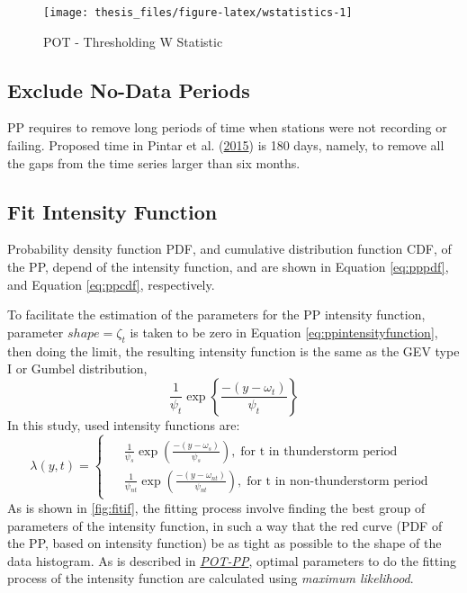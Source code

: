 \documentclass[12pt,oneside]{reedthesis}
\begin{document}
\footnotesize
\begin{figure}

{\centering \texttt{[image: thesis\_files/figure-latex/wstatistics-1]} 

}

\caption{POT - Thresholding W Statistic}\label{fig:wstatistics}
\end{figure}
\normalsize

\hypertarget{exclude-no-data-periods}{%
\subsection{Exclude No-Data Periods}\label{exclude-no-data-periods}}

PP requires to remove long periods of time when stations were not recording or failing. Proposed time in Pintar et al. (\protect\hyperlink{ref-Pintar2015}{2015}) is 180 days, namely, to remove all the gaps from the time series larger than six months.

\hypertarget{fit-intensity-function}{%
\subsection{Fit Intensity Function}\label{fit-intensity-function}}

Probability density function PDF, and cumulative distribution function CDF, of the PP, depend of the intensity function, and are shown in Equation \eqref{eq:pppdf}, and Equation \eqref{eq:ppcdf}, respectively.

To facilitate the estimation of the parameters for the PP intensity function, parameter \(shape = \zeta_t\) is taken to be zero in Equation \eqref{eq:ppintensityfunction}, then doing the limit, the resulting intensity function is the same as the GEV type I or Gumbel distribution,
\begin{equation}
          \frac{1}{\psi_t}\exp\left\{\frac{-(y-\omega_t)}{\psi_t}\right\}
  \label{eq:ppusedif}
\end{equation}
In this study, used intensity functions are:
\begin{equation}
    \lambda\left(y,t\right)=
    \begin{cases}
      \begin{aligned}
            &\frac{1}{\psi_s}\exp\left(\frac{-(y-\omega_s)}{\psi_s}\right),\;\textrm{for t in thunderstorm period}
            \\
            &\frac{1}{\psi_{nt}}\exp\left(\frac{-(y-\omega_{nt})}{\psi_{nt}}\right),\;\textrm{for t in non-thunderstorm period}    
      \end{aligned}
    \end{cases}
  \label{eq:ppspecificintensityfunction}
\end{equation}
As is shown in \ref{fig:fitif}, the fitting process involve finding the best group of parameters of the intensity function, in such a way that the red curve (PDF of the PP, based on intensity function) be as tight as possible to the shape of the data histogram. As is described in \emph{\protect\hyperlink{pot-pp}{POT-PP}}, optimal parameters to do the fitting process of the intensity function are calculated using \emph{maximum likelihood}.
\end{document}
